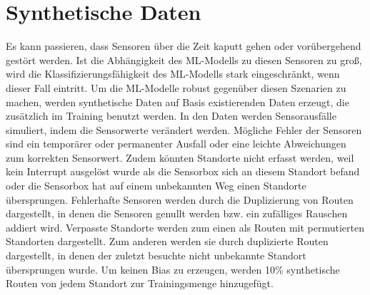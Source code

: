 \section{Synthetische Daten}
Es kann passieren, dass Sensoren über die Zeit kaputt gehen oder vorübergehend gestört werden.
Ist die Abhängigkeit des ML-Modells zu diesen Sensoren zu groß, wird die Klassifizierungsfähigkeit des ML-Modells stark eingeschränkt, wenn dieser Fall eintritt.
Um die ML-Modelle robust gegenüber diesen Szenarien zu machen, werden synthetische Daten auf Basis existierenden Daten erzeugt, die zusätzlich im Training benutzt werden.
In den Daten werden Sensorausfälle simuliert, indem die Sensorwerte verändert werden.
\newpage
Mögliche Fehler der Sensoren sind ein temporärer oder permanenter Ausfall oder eine leichte Abweichungen zum korrekten Sensorwert.
Zudem könnten Standorte nicht erfasst werden, weil kein Interrupt ausgelöst wurde als die Sensorbox sich an diesem Standort befand
oder die Sensorbox hat auf einem unbekannten Weg einen Standorte übersprungen.
\newline
\newline
Fehlerhafte Sensoren werden durch die Duplizierung von Routen dargestellt, in denen die Sensoren genullt werden bzw. ein zufälliges Rauschen addiert wird.
Verpasste Standorte werden zum einen als Routen mit permutierten Standorten dargestellt.
Zum anderen werden sie durch duplizierte Routen dargestellt, in denen der zuletzt besuchte nicht unbekannte Standort übersprungen wurde.
Um keinen Bias zu erzeugen, werden 10\% synthetische Routen von jedem Standort zur Trainingsmenge hinzugefügt.